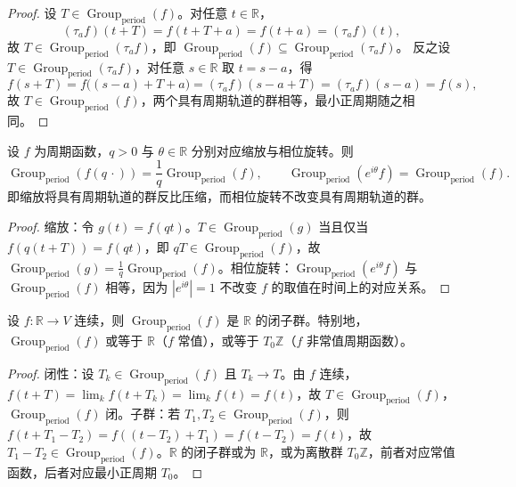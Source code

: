 \begin{proof}
设 $T\in\operatorname{Group}_{\mathrm{period}}(f)$。对任意 $t\in\mathbb{R}$，
\[
(\tau_a f)(t+T) = f(t+T+a) = f(t+a) = (\tau_a f)(t),
\]
故 $T\in\operatorname{Group}_{\mathrm{period}}(\tau_a f)$，即 $\operatorname{Group}_{\mathrm{period}}(f)\subseteq\operatorname{Group}_{\mathrm{period}}(\tau_a f)$。
反之设 $T\in\operatorname{Group}_{\mathrm{period}}(\tau_a f)$，对任意 $s\in\mathbb{R}$ 取 $t = s-a$，得
\[
f(s+T) = f\bigl((s-a)+T+a\bigr) = (\tau_a f)(s-a+T) = (\tau_a f)(s-a) = f(s),
\]
故 $T\in\operatorname{Group}_{\mathrm{period}}(f)$，两个具有周期轨道的群相等，最小正周期随之相同。
\end{proof}

\begin{proposition}[缩放与旋转下具有周期轨道的群的变换]\label{prop:scaling_rotation_period}
设 $f$ 为周期函数，$q>0$ 与 $\theta\in\mathbb{R}$ 分别对应缩放与相位旋转。则
\[
\operatorname{Group}_{\mathrm{period}}(f(q\,\cdot)) = \frac{1}{q}\operatorname{Group}_{\mathrm{period}}(f), \qquad
\operatorname{Group}_{\mathrm{period}}(e^{i\theta} f) = \operatorname{Group}_{\mathrm{period}}(f).
\]
即缩放将具有周期轨道的群反比压缩，而相位旋转不改变具有周期轨道的群。
\end{proposition}

\begin{proof}
缩放：令 $g(t)=f(qt)$。$T\in\operatorname{Group}_{\mathrm{period}}(g)$ 当且仅当 $f(q(t+T))=f(qt)$，即 $qT\in\operatorname{Group}_{\mathrm{period}}(f)$，故 $\operatorname{Group}_{\mathrm{period}}(g)=\frac{1}{q}\operatorname{Group}_{\mathrm{period}}(f)$。相位旋转：$\operatorname{Group}_{\mathrm{period}}(e^{i\theta}f)$ 与 $\operatorname{Group}_{\mathrm{period}}(f)$ 相等，因为 $|e^{i\theta}|=1$ 不改变 $f$ 的取值在时间上的对应关系。
\end{proof}

\begin{proposition}[具有周期轨道的群是闭子群]\label{prop:group_with_periodic_orbits_closed}
设 $f:\mathbb{R}\to V$ 连续，则 $\operatorname{Group}_{\mathrm{period}}(f)$ 是 $\mathbb{R}$ 的闭子群。特别地，$\operatorname{Group}_{\mathrm{period}}(f)$ 或等于 $\mathbb{R}$（$f$ 常值），或等于 $T_0\mathbb{Z}$（$f$ 非常值周期函数）。
\end{proposition}

\begin{proof}
闭性：设 $T_k\in\operatorname{Group}_{\mathrm{period}}(f)$ 且 $T_k\to T$。由 $f$ 连续，$f(t+T)=\lim_k f(t+T_k)=\lim_k f(t)=f(t)$，故 $T\in\operatorname{Group}_{\mathrm{period}}(f)$，$\operatorname{Group}_{\mathrm{period}}(f)$ 闭。子群：若 $T_1,T_2\in\operatorname{Group}_{\mathrm{period}}(f)$，则 $f(t+T_1-T_2)=f((t-T_2)+T_1)=f(t-T_2)=f(t)$，故 $T_1-T_2\in\operatorname{Group}_{\mathrm{period}}(f)$。$\mathbb{R}$ 的闭子群或为 $\mathbb{R}$，或为离散群 $T_0\mathbb{Z}$，前者对应常值函数，后者对应最小正周期 $T_0$。
\end{proof}

